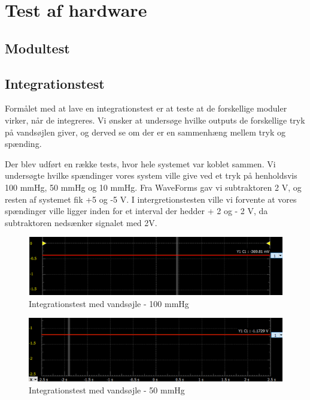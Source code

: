 \section{Test af hardware}
\subsection{Modultest}

\subsection{Integrationstest}
Formålet med at lave en integrationstest er at teste at de forskellige moduler virker, når de integreres. Vi ønsker at undersøge hvilke outputs de forskellige tryk på vandsøjlen giver, og derved se om der er en sammenhæng mellem tryk og spænding.

Der blev udført en række tests, hvor hele systemet var koblet sammen. Vi undersøgte hvilke spændinger vores system ville give ved et tryk på henholdsvis 100 mmHg, 50 mmHg og 10 mmHg.  Fra WaveForms gav vi subtraktoren 2 V, og resten af systemet fik +5 og -5 V. I intergretionstesten ville vi forvente at vores spændinger ville ligger inden for et interval der hedder + 2 og - 2 V, da subtraktoren nedsænker signalet med 2V.

\vspace{0.5 cm}

\begin{figure}[h!]
	\centering
	\includegraphics[width=0.75\linewidth]{../Rapport/Implementering_og_test/Hardware/integration100mmhg}
	\caption{Integrationstest med vandsøjle - 100 mmHg}
	\label{fig:i100mmhg}
\end{figure}

\begin{figure}[h!]
	\centering
	\includegraphics[width=0.75\linewidth]{../Rapport/Implementering_og_test/Hardware/integration50mmhg}
	\caption{Integrationstest med vandsøjle - 50 mmHg}
	\label{fig:i50mmhg}
\end{figure}

